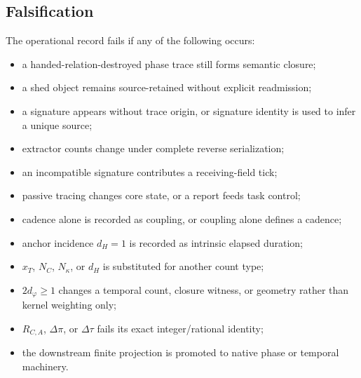 \subsection{Falsification}\label{manual:phase-temporal:falsification}
The operational record fails if any of the following occurs:
\begin{itemize}[leftmargin=*]
\item a handed-relation-destroyed phase trace still forms semantic closure;
\item a shed object remains source-retained without explicit readmission;
\item a signature appears without trace origin, or signature identity is used to infer a unique source;
\item extractor counts change under complete reverse serialization;
\item an incompatible signature contributes a receiving-field tick;
\item passive tracing changes core state, or a report feeds task control;
\item cadence alone is recorded as coupling, or coupling alone defines a cadence;
\item anchor incidence \(d_H=1\) is recorded as intrinsic elapsed duration;
\item \(x_T\), \(N_C\), \(N_\kappa\), or \(d_H\) is substituted for another count type;
\item \(2d_\varphi\ge1\) changes a temporal count, closure witness, or geometry rather than kernel weighting only;
\item \(R_{C,A}\), \(\Delta\pi\), or \(\Delta\tau\) fails its exact integer/rational identity;
\item the downstream finite projection is promoted to native phase or temporal machinery.
\end{itemize}

